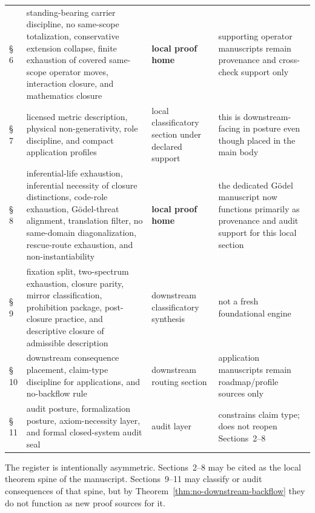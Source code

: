 \begin{longtable}{P{0.13\textwidth}P{0.26\textwidth}P{0.26\textwidth}P{0.22\textwidth}}
\S\,6 & standing-bearing carrier discipline, no same-scope totalization, conservative extension collapse, finite exhaustion of covered same-scope operator moves, interaction closure, and mathematics closure & \textbf{local proof home} & supporting operator manuscripts remain provenance and cross-check support only \\
\S\,7 & licensed metric description, physical non-generativity, role discipline, and compact application profiles & local classificatory section under declared support & this is downstream-facing in posture even though placed in the main body \\
\S\,8 & inferential-life exhaustion, inferential necessity of closure distinctions, code-role exhaustion, G\"odel-threat alignment, translation filter, no same-domain diagonalization, rescue-route exhaustion, and non-instantiability & \textbf{local proof home} & the dedicated G\"odel manuscript now functions primarily as provenance and audit support for this local section \\
\S\,9 & fixation split, two-spectrum exhaustion, closure parity, mirror classification, prohibition package, post-closure practice, and descriptive closure of admissible description & downstream classificatory synthesis & not a fresh foundational engine \\
\S\,10 & downstream consequence placement, claim-type discipline for applications, and no-backflow rule & downstream routing section & application manuscripts remain roadmap/profile sources only \\
\S\,11 & audit posture, formalization posture, axiom-necessity layer, and formal closed-system audit seal & audit layer & constrains claim type; does not reopen Sections~2--8 \\
\end{longtable}

\begin{remark}
The register is intentionally asymmetric. Sections~2--8 may be cited as the local theorem spine of the manuscript. Sections~9--11 may classify or audit consequences of that spine, but by Theorem~\ref{thm:no-downstream-backflow} they do not function as new proof sources for it.
\end{remark}
